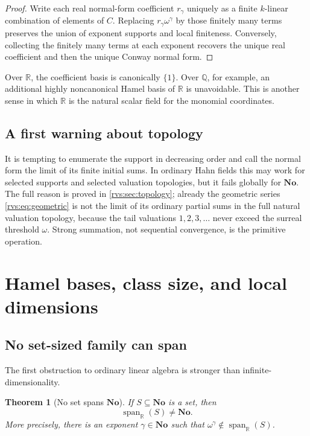 \documentclass[11pt,letterpaper]{article}
\numberwithin{equation}{section}
\newtheorem{theorem}{Theorem}[section]
\theoremstyle{definition}
\theoremstyle{remark}
\newcommand{\No}{\mathbf{No}}
\newcommand{\R}{\mathbb{R}}
\newcommand{\Q}{\mathbb{Q}}
\newcommand{\Span}{\operatorname{span}}
\begin{document}
\begin{proof}
Write each real normal-form coefficient \(r_\gamma\) uniquely as a finite
\(k\)-linear combination of elements of \(C\).  Replacing
\(r_\gamma\omega^\gamma\) by those finitely many terms preserves the union of
exponent supports and local finiteness.  Conversely, collecting the finitely
many terms at each exponent recovers the unique real coefficient and then the
unique Conway normal form.
\end{proof}

Over \(\R\), the coefficient basis is canonically \(\{1\}\).  Over \(\Q\),
for example, an additional highly noncanonical Hamel basis of \(\R\) is
unavoidable.  This is another sense in which \(\R\) is the natural scalar
field for the monomial coordinates.

\subsection{A first warning about topology}

It is tempting to enumerate the support in decreasing order and call the
normal form the limit of its finite initial sums.  In ordinary Hahn fields
this may work for selected supports and selected valuation topologies, but it
fails globally for \(\No\).  The full reason is proved in
\cref{rvs:sec:topology}; already the geometric series \eqref{rvs:eq:geometric} is not
the limit of its ordinary partial sums in the full natural valuation topology,
because the tail valuations \(1,2,3,\ldots\) never exceed the surreal
threshold \(\omega\).  Strong summation, not sequential convergence, is the
primitive operation.
\section{Hamel bases, class size, and local dimensions}\label{rvs:sec:hamel}
\label{rvs:eu:sec:dimension}

\subsection{No set-sized family can span}\label{rvs:subsec:no-set-span}

The first obstruction to ordinary linear algebra is stronger than
infinite-dimensionality.

\begin{theorem}[No set spans \(\No\)]\label{rvs:thm:no-set-spans}
\label{rvs:cv:thm:no-set-spans}
If \(S\subseteq\No\) is a set, then
\[
  \Span_{\R}(S)\ne\No.
\]
More precisely, there is an exponent \(\gamma\in\No\) such that
\(\omega^\gamma\notin\Span_{\R}(S)\).
\end{theorem}
\end{document}
